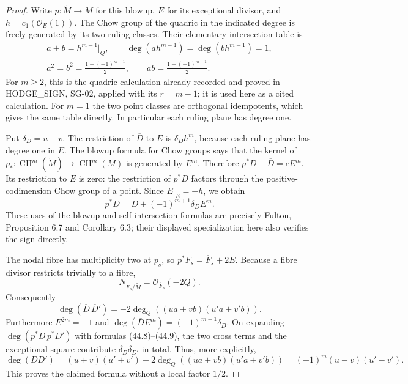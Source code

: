 \documentclass[11pt,a4paper]{article}
\theoremstyle{definition}
\theoremstyle{remark}
\begin{document}
\begin{proof}
Write $p:\widetilde M\to M$ for this blowup, $E$ for its exceptional
divisor, and $h=c_1(\mathcal O_E(1))$.  The Chow group of the quadric
in the indicated degree is freely generated by its two ruling
classes.  Their elementary intersection table is
\[
 \begin{gathered}
 a+b=h^{m-1}|_Q,\qquad
 \deg(a h^{m-1})=\deg(b h^{m-1})=1,\\
 a^2=b^2=\frac{1+(-1)^{m-1}}2,\qquad
 ab=\frac{1-(-1)^{m-1}}2.
 \end{gathered}                                             \tag{44.7}
\]
For $m\ge2$, this is the quadric calculation already recorded and
proved in HODGE\_SIGN, SG-02, applied with its $r=m-1$; it is used
here as a cited calculation.  For $m=1$ the two point classes are
orthogonal idempotents, which gives the same table directly.
In particular each ruling plane has degree one.

Put $\delta_D=u+v$.  The restriction of $\overline D$ to $E$ is
$\delta_Dh^m$, because each ruling plane has degree one in $E$.
The blowup formula for Chow groups says that the kernel of
$p_*:\operatorname{CH}^{m}(\widetilde M)\to\operatorname{CH}^{m}(M)$
is generated by $E^m$.  Therefore $p^*D-\overline D=cE^m$.
Its restriction to $E$ is zero: the restriction of $p^*D$ factors
through the positive-codimension Chow group of a point.  Since
$E|_E=-h$, we obtain
\[
 p^*D=\overline D+(-1)^{m+1}\delta_D E^m.                   \tag{44.8}
\]
These uses of the blowup and self-intersection formulas are precisely
Fulton, Proposition 6.7 and Corollary 6.3; their displayed
specialization here also verifies the sign directly.

The nodal fibre has multiplicity two at $p_s$, so
$p^*F_s=\overline F_s+2E$.  Because a fibre divisor restricts
trivially to a fibre,
\[
 N_{\overline F_s/\widetilde M}=\mathcal O_{\overline F_s}(-2Q).
\]
Consequently
\[
 \deg(\overline D\,\overline D')=-2\deg_Q((ua+vb)(u'a+v'b)).
 \tag{44.9}
\]
Furthermore $E^{2m}=-1$ and
$\deg(\overline D E^m)=(-1)^{m-1}\delta_D$.  On expanding
$\deg(p^*D\,p^*D')$ with formulas (44.8)--(44.9), the two cross terms and
the exceptional square contribute $\delta_D\delta_{D'}$ in total.
Thus, more explicitly,
\[
 \deg(DD')=(u+v)(u'+v')-2\deg_Q((ua+vb)(u'a+v'b))
          =(-1)^m(u-v)(u'-v').
\]
This proves the claimed formula without a local factor $1/2$.


\end{proof}
\end{document}
